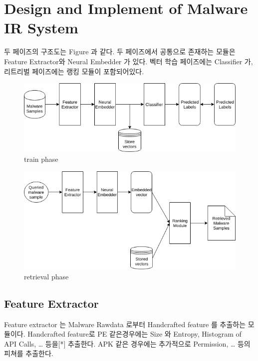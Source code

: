 

\section{Design and Implement of Malware IR System}

두 페이즈의 구조도는 Figure 과 같다. 두 페이즈에서 공통으로 존재하는 모듈은 Feature Extractor와 Neural Embedder 가 있다. 벡터 학습 페이즈에는 Classifier 가, 리트리벌 페이즈에는 랭킹 모듈이 포함되어있다. 
\begin{figure}
  \includegraphics[width=\linewidth]{../figures/train_phase.png}
  \caption{train phase}
  \label{fig:one}
\end{figure}
\begin{figure}
  \includegraphics[width=\linewidth]{../figures/retrieval_phase.png}
  \caption{retrieval phase}
  \label{fig:two}
\end{figure}


\subsection{Feature Extractor}

Feature extractor 는 Malware Rawdata 로부터 Handcrafted feature 를 추출하는 모듈이다. Handcrafted feature로 PE 같은경우에는 Size 와 Entropy, Histogram of API Calls, … 등을[*] 추출한다. APK 같은 경우에는 추가적으로 Permission,  … 등의 피쳐를 추출한다. 


